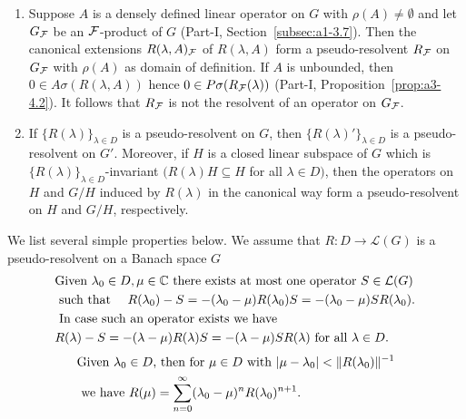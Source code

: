 \begin{example}\label{ex:c3-2.5}
	\begin{enumerate}[\upshape (i), wide, labelindent=.25em]
		\item 
		Suppose $A$ is a densely defined linear operator on $G$ with $\rho(A) \neq \emptyset$ and let $G_{\mathcal{F}}$ be an $\mathcal{F}$-product of\/ $G$ (\cf Part-I, Section~\ref{subsec:a1-3.7}).
		Then the canonical extensions $R(\lambda,A)_{\mathcal{F}}$ of\/ $R(\lambda,A)$ form a pseudo-resolvent $R_{\mathcal{F}}$ on $G_{\mathcal{F}}$ with $\rho(A)$ as domain of definition.
		If\/ $A$ is unbounded, then $0 \in A\sigma(R(\lambda,A))$ hence $0 \in P\sigma(R_{\mathcal{F}}(\lambda))$ (\cf Part-I, Proposition~\ref{prop:a3-4.2}).
		It follows that $R_{\mathcal{F}}$ is not the resolvent of an operator on $G_{\mathcal{F}}$.
		
		\item 
		If\/ $\{R(\lambda)\}_{\lambda\in D}$ is a pseudo-resolvent on $G$, then $\{R(\lambda)'\}_{\lambda\in D}$ is a pseudo-resolvent on $G'$.
		Moreover, if\/ $H$ is a closed linear subspace of\/ $G$ which is $\{R(\lambda)\}_{\lambda\in D}$-invariant $(R(\lambda)H \subseteq H$ for all $\lambda \in D)$, then the operators on $H$ and $G/H$ induced by $R(\lambda)$ in the canonical way form a pseudo-resolvent on $H$ and $G/H$, respectively.
	\end{enumerate}
\end{example}
We list several simple properties below.
We assume that $R \colon D \to \mathcal{L}(G)$ is a pseudo-resolvent on a Banach space $G$
\begin{equation}\label{eq:c3-2.10}
	\begin{split}
	&\text{Given  $\lambda_{0} \in D, \mu \in \mathbb{C} $  there exists at most one operator  $S \in \mathcal{L}(G)$ }\\
	&\text{ such that \quad $R(\lambda_{0}) - S = -(\lambda_{0}-\mu)R(\lambda_{0})S = -(\lambda_{0}-\mu)SR(\lambda_{0})$} .\\
	&\text{ In case such an operator exists we have} \\
	&\text{$R(\lambda) - S = -(\lambda-\mu)R(\lambda)S = -(\lambda-\mu)SR(\lambda)$ for all $\lambda \in D$} .
	\end{split}
\end{equation}
\begin{equation}\label{eq:c3-2.11}
	\begin{split}
	&\text{Given  $\lambda_{0} \in D$,  then for  $\mu \in D$  with  $|\mu-\lambda_{0}| < \|R(\lambda_{0})\|^{-1}$}\\ 
	&\text{ we have $ R(\mu) = \sum_{n=0}^{\infty} (\lambda_{0}-\mu)^n R(\lambda_{0})^{n+1}$} .
	\end{split}
\end{equation}
